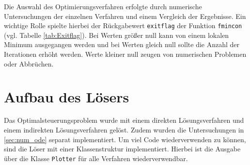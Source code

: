 Die Auswahl des Optimierungsverfahren erfolgte durch numerische Untersuchungen der einzelnen Verfahren und einem Vergleich der Ergebnisse. Ein wichtige Rolle spielte hierbei der Rückgabewert \texttt{exitflag} der Funktion \texttt{fmincon} (vgl. Tabelle \ref{tab:Exitflag}). Bei Werten größer null kann von einem lokalen Minimum ausgegangen werden und bei Werten gleich null sollte die Anzahl der Iterationen erhöht werden. Werte kleiner null zeugen von numerischen Problemen oder Abbrüchen.

%
%

%


\section{Aufbau des Lösers}
Das Optimalsteuerungsproblem wurde mit einem direkten Lösungsverfahren und einem indirekten Lösungsverfahren gelöst. Zudem wurden die Untersuchungen in \autoref{sec:num_ode} separat implementiert. Um viel Code wiederverwenden zu können, sind die Löser mit einer Klassenstruktur implementiert. Hierbei ist die Ausgabe über die Klasse \verb+Plotter+ für alle Verfahren wiederverwendbar.

